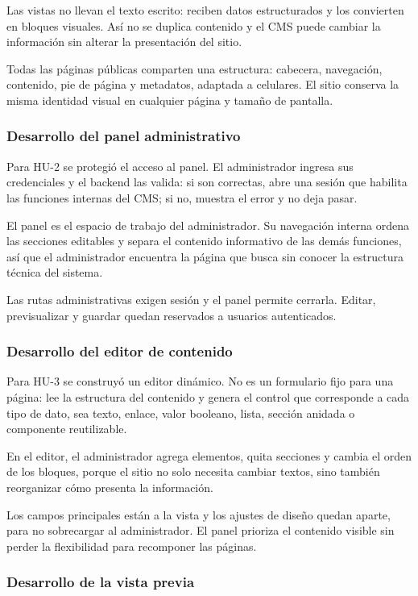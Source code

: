 Las vistas no llevan el texto escrito: reciben datos estructurados y los convierten en bloques visuales. Así no se duplica contenido y el CMS puede cambiar la información sin alterar la presentación del sitio.

Todas las páginas públicas comparten una estructura: cabecera, navegación, contenido, pie de página y metadatos, adaptada a celulares. El sitio conserva la misma identidad visual en cualquier página y tamaño de pantalla.

\subsubsection{Desarrollo del panel administrativo}

Para HU-2 se protegió el acceso al panel. El administrador ingresa sus credenciales y el backend las valida: si son correctas, abre una sesión que habilita las funciones internas del CMS; si no, muestra el error y no deja pasar.

El panel es el espacio de trabajo del administrador. Su navegación interna ordena las secciones editables y separa el contenido informativo de las demás funciones, así que el administrador encuentra la página que busca sin conocer la estructura técnica del sistema.

Las rutas administrativas exigen sesión y el panel permite cerrarla. Editar, previsualizar y guardar quedan reservados a usuarios autenticados.

\subsubsection{Desarrollo del editor de contenido}

Para HU-3 se construyó un editor dinámico. No es un formulario fijo para una página: lee la estructura del contenido y genera el control que corresponde a cada tipo de dato, sea texto, enlace, valor booleano, lista, sección anidada o componente reutilizable.

En el editor, el administrador agrega elementos, quita secciones y cambia el orden de los bloques, porque el sitio no solo necesita cambiar textos, sino también reorganizar cómo presenta la información.

Los campos principales están a la vista y los ajustes de diseño quedan aparte, para no sobrecargar al administrador. El panel prioriza el contenido visible sin perder la flexibilidad para recomponer las páginas.

\subsubsection{Desarrollo de la vista previa}

